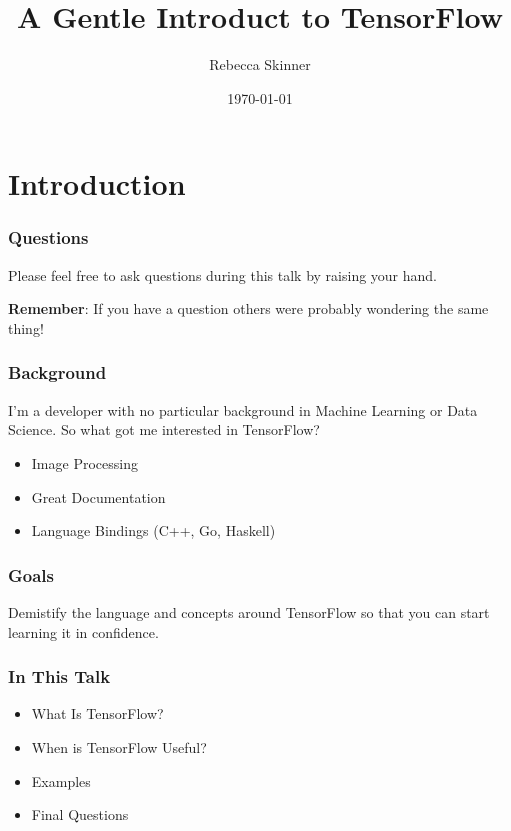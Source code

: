 \documentclass{beamer}
\title{A Gentle Introduct to TensorFlow}
\author{Rebecca Skinner}
\institute{Asteris}
\date{\today}
\begin{document}
\begin{frame}
  \titlepage{}
\end{frame}

\section{Introduction}

\begin{frame}
  \frametitle{Questions}

  Please feel free to ask questions during this talk by raising your hand.

  {\bf Remember}: If you have a question others were probably wondering the same thing!
\end{frame}


\begin{frame}
  \frametitle{Background}
  I'm a developer with no particular background in Machine Learning or
  Data Science.  So what got me interested in TensorFlow?
  \begin{itemize}
    \item Image Processing
    \item Great Documentation
    \item Language Bindings (C++, Go, Haskell)
  \end{itemize}
\end{frame}

\begin{frame}
  \frametitle{Goals}
  Demistify the language and concepts around TensorFlow so that you
  can start learning it in confidence.
\end{frame}

\begin{frame}
  \frametitle{In This Talk}

  \begin{itemize}
  \item What Is TensorFlow?
  \item When is TensorFlow Useful?
  \item Examples
  \item Final Questions
  \end{itemize}
\end{frame}
\end{document}
